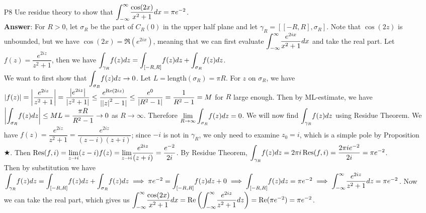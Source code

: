 \documentclass{article}
\begin{document}
\newpage
\begin{itemize}
      \item [P8] Use residue theory to show that $\mathlarger{\int_{-\infty}^\infty}\dfrac{\cos(2x)}{x^2+1}dx=\pi e^{-2}$.\\
            \textbf{Answer}: For $R>0$, let $\sigma_R$ be the part of $C_R(0)$ in the upper half plane and let $\gamma_R=[[-R,R],\sigma_R]$. Note that $\cos(2z)$ is unbounded, but we have $\cos(2x)=\Re(e^{2ix})$, meaning that we can first evaluate $\mathlarger{\int_{-\infty}^\infty}\dfrac{e^{2ix}}{x^2+1}dx$ and take the real part. Let $f(z)=\dfrac{e^{2iz}}{z^2+1}$, then we have $\mathlarger{\int_{\gamma_R}}f(z)dz=\mathlarger{\int_{[-R,R]}}f(z)dz+\mathlarger{\int_{\sigma_R}}f(z)dz$.\\
            We want to first show that $\mathlarger{\int_{\sigma_R}}f(z)dz\rightarrow 0$. Let $L=\text{length}(\sigma_R)=\pi R$. For $z$ on $\sigma_R$, we have $\abs{f(z)}=\abs{\dfrac{e^{2iz}}{z^2+1}}=\dfrac{\abs{e^{2iz}}}{\abs{z^2+1}}\leq\dfrac{e^{\Re(2iz)}}{|\abs{z}^2-1|}\leq\dfrac{e^0}{\abs{R^2-1}}=\dfrac{1}{R^2-1}=M$ for $R$ large enough. Then by ML-estimate, we have $\abs{\mathlarger{\int_{\sigma_R}}f(z)dz}\leq ML=\dfrac{\pi R}{R^2-1}\rightarrow 0$ as $R\rightarrow\infty$. Therefore $\mathlarger{\lim_{R\rightarrow\infty}\int_{\sigma_R}}f(z)dz=0$.
            We will now find $\mathlarger{\int_{\gamma_R}}f(z)dz$ using Residue Theorem. We have $f(z)=\dfrac{e^{2iz}}{z^2+1}=\dfrac{e^{2iz}}{(z-i)(z+i)}$; since $-i$ is not in $\gamma_R$, we only need to examine $z_0=i$, which is a simple pole by Proposition $\bigstar$. Then $\Res(f,i)=\mathlarger{\lim_{z\rightarrow i}}(z-i)f(z)=\mathlarger{\lim_{z\rightarrow i}}\dfrac{e^{2iz}}{(z+i)}=\dfrac{e^{-2}}{2i}$. By Residue Theorem, $\mathlarger{\int_{\gamma_R}}f(z)dz=2\pi i\Res(f,i)=\dfrac{2\pi ie^{-2}}{2i}=\pi e^{-2}$.\\
            Then by substitution we have $\mathlarger{\int_{\gamma_R}}f(z)dz=\mathlarger{\int_{[-R,R]}}f(z)dz+\mathlarger{\int_{\sigma_R}}f(z)dz\implies \pi e^{-2}=\mathlarger{\int_{[-R,R]}}f(z)dz+0\implies\mathlarger{\int_{[-R,R]}}f(z)dz=\pi e^{-2}\implies\mathlarger{\int_{-\infty}^\infty}\dfrac{e^{2iz}}{z^2+1}dz=\pi e^{-2}$. Now we can take the real part, which gives us $\mathlarger{\int_{-\infty}^\infty}\dfrac{\cos(2x)}{x^2+1}dx=\Re\left(\mathlarger{\int_{-\infty}^\infty}\dfrac{e^{2iz}}{z^2+1}dz\right)=\Re(\pi e^{-2})=\pi e^{-2}$.
\end{itemize}
\end{document}

